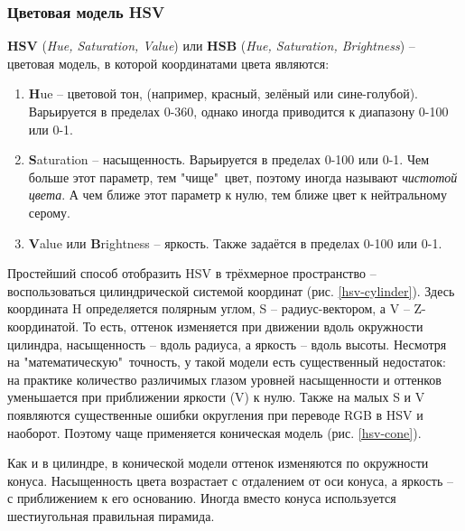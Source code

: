 \subsubsection{Цветовая модель HSV}

{\bf HSV} ({\it Hue, Saturation, Value}) или {\bf HSB} ({\it Hue, Saturation, Brightness}) --
цветовая модель, в которой координатами цвета являются:
\begin{enumerate}
	\item {\bf H}ue -- цветовой тон, (например, красный, зелёный или сине-голубой). Варьируется 
в пределах 0-360\textdegree, однако иногда приводится к диапазону 0-100 или 0-1.
	\item {\bf S}aturation -- насыщенность. Варьируется в пределах 0-100 или 0-1. Чем больше
этот параметр, тем "чище"\ цвет, поэтому иногда называют {\it чистотой цвета}. А чем ближе этот
параметр к нулю, тем ближе цвет к нейтральному серому.
	\item {\bf V}alue или {\bf B}rightness -- яркость. Также задаётся в пределах 0-100 или 0-1.
\end{enumerate}

Простейший способ отобразить HSV в трёхмерное пространство -- воспользоваться цилиндрической
системой координат (рис. \ref{hsv-cylinder}). 
Здесь координата H определяется полярным углом, S -- радиус-вектором, а V --
Z-координатой. То есть, оттенок изменяется при движении вдоль окружности цилиндра, насыщенность 
-- вдоль радиуса, а яркость -- вдоль высоты. Несмотря на "математическую"\ точность, у такой
модели есть существенный недостаток: на практике количество различимых глазом уровней 
насыщенности и оттенков уменьшается при приближении яркости (V) к нулю. Также на малых S и V 
появляются существенные ошибки округления при переводе RGB в HSV и наоборот. Поэтому чаще
применяется коническая модель (рис. \ref{hsv-cone}).


Как и в цилиндре, в конической модели оттенок изменяются по окружности конуса. Насыщенность 
цвета возрастает с отдалением от оси конуса, а яркость -- с приближением к его основанию. Иногда
вместо конуса используется шестиугольная правильная пирамида.


